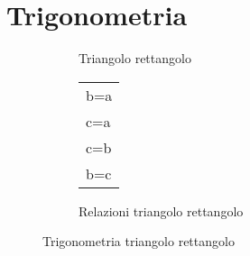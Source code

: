 \chapter{Trigonometria}
\label{cha:trigonometria}
\minitoc
\mtcskip                                %
\minilof                                %
\mtcskip                                %
\minilot
\begin{figure}
	\begin{subfigure}[b]{.5\linewidth}
		\centering
		\caption{Triangolo rettangolo}\label{fig:TrigTriangoloRettangolo}
	\end{subfigure}%
	\begin{subfigure}[b]{.5\linewidth}
		\centering
		\begin{tabular}{L}
			\toprule
			b=a\cos\alpha\\
			c=a\sen\alpha\\
			c=b\tg\alpha\\
			b=c\cotg\alpha\\
			\bottomrule
		\end{tabular}
		\caption{Relazioni triangolo rettangolo}\label{fig:TeoremiTrinagoloRettangolo}
	\end{subfigure}
\caption{Trigonometria triangolo rettangolo}
\label{tab:trigonometriatriangolorettangolo}
\end{figure}
%
%

